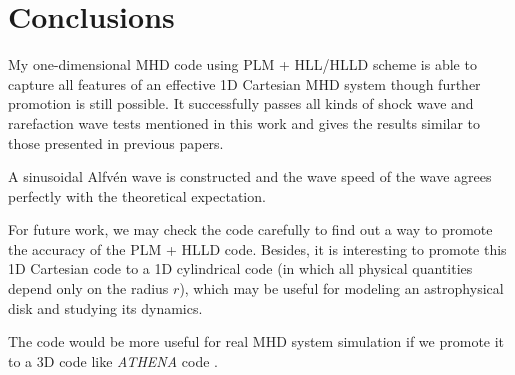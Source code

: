 \documentclass[10.5pt]{article}
\begin{document}
\section{Conclusions}
My one-dimensional MHD code using PLM + HLL/HLLD scheme is able to 
capture all features of an effective 1D Cartesian MHD system though further promotion is
still possible. It successfully passes all kinds of shock wave and rarefaction wave tests mentioned 
in this work and gives the results similar to those presented in previous papers.

A sinusoidal Alfv\'en wave is constructed and the wave speed of the wave agrees perfectly with 
the theoretical expectation.

For future work, we may check the code carefully to find out a way to promote the accuracy of 
the PLM + HLLD code. Besides, it is interesting to promote this 1D Cartesian code to 
a 1D cylindrical code (in which all physical quantities depend only on the radius $r$), which may be useful for modeling an astrophysical disk and studying its dynamics.

The code would be more useful for real MHD system simulation if we promote it to 
a 3D code like \textit{ATHENA} code \cite{stone2008athena}.


\end{document}
